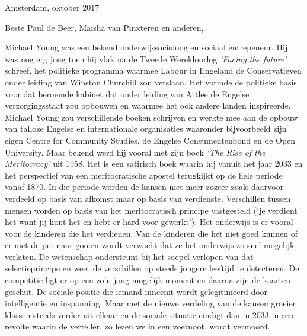 \documentclass[]{book}
\begin{document}
Amsterdam, oktober 2017

Beste Paul de Beer, Maisha van Pinxteren en anderen,

Michael Young was een bekend onderwijssocioloog en sociaal entrepeneur.
Hij was nog erg jong toen hij vlak na de Tweede Wereldoorlog
\emph{`Facing the future'} schreef, het politieke programma waarmee
Labour in Engeland de Conservatieven onder leiding van Winston Churchill
zou verslaan. Het vormde de politieke basis voor dat beroemde kabinet
dat onder leiding van Attlee de Engelse verzorgingsstaat zou opbouwen en
waarmee het ook andere landen inspireerde. Michael Young zou
verschillende boeken schrijven en werkte mee aan de opbouw van talloze
Engelse en internationale organisaties waaronder bijvoorbeeld zijn eigen
Centre for Community Studies, de Engelse Consumentenbond en de Open
University. Maar bekend werd hij vooral met zijn boek \emph{`The Rise of
the Meritocracy'} uit 1958. Het is een satirisch boek waarin hij vanuit
het jaar 2033 en het perspectief van een meritocratische apostel
terugkijkt op de hele periode vanaf 1870. In die periode worden de
kansen niet meer zozeer zoals daarvoor verdeeld op basis van afkomst
maar op basis van verdienste. Verschillen tussen mensen worden op basis
van het meritocratisch principe vastgesteld (`je verdient het want jij
kunt het en hebt er hard voor gewerkt'). Het onderwijs is er vooral voor
de kinderen die het verdienen. Van de kinderen die het niet goed kunnen
of er met de pet naar gooien wordt verwacht dat ze het onderwijs zo snel
mogelijk verlaten. De wetenschap ondersteunt bij het soepel verlopen van
dat selectieprincipe en weet de verschillen op steeds jongere leeftijd
te detecteren. De competitie ligt er op een zo'n jong mogelijk moment en
daarna zijn de kaarten geschut. De sociale positie die iemand inneemt
wordt gelegitimeerd door intelligentie en inspanning. Maar met de nieuwe
verdeling van de kansen groeien klassen steeds verder uit elkaar en de
sociale situatie eindigt dan in 2033 in een revolte waarin de verteller,
zo lezen we in een voetnoot, wordt vermoord.
\end{document}
